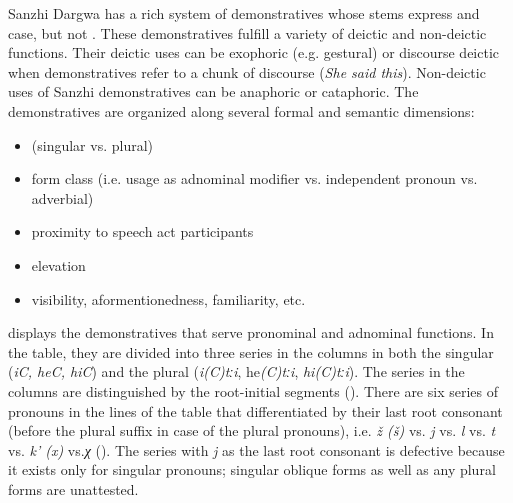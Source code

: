 Sanzhi Dargwa has a rich system of demonstratives whose stems express  and case, but not . These demonstratives fulfill a variety of deictic and non-deictic functions. Their deictic uses can be exophoric (e.g. gestural) or discourse deictic when demonstratives refer to a chunk of discourse (\textit{She said this}). Non-deictic uses of Sanzhi demonstratives can be anaphoric or cataphoric. The demonstratives are organized along several formal and semantic dimensions:
%
\pagebreak
\begin{itemize}
	\item	{} (singular vs. plural)
	\item	form class (i.e. usage as adnominal modifier vs. independent pronoun vs. adverbial) 
	\item	proximity to speech act participants
	\item	elevation
	\item	visibility, aformentionedness, familiarity, etc.
\end{itemize}
%
 displays the demonstratives that serve pronominal and adnominal functions. In the table, they are divided into three series in the columns in both the singular (\textit{iC, heC, hiC}) and the plural (\textit{i(C)tːi}, he\textit{(C)tːi}, \textit{hi(C)tːi}). The series in the columns are distinguished by the root-initial segments (). There are six series of pronouns in the lines of the table that differentiated by their last root consonant (before the plural suffix in case of the plural pronouns), i.e. \textit{ž (š)} vs. \textit{j} vs. \textit{l} vs. \textit{t} vs. \textit{k' (x)} vs.\textit{χ} (). The series with \textit{j} as the last root consonant is defective because it exists only for singular  pronouns; singular oblique forms as well as any plural forms are unattested.

